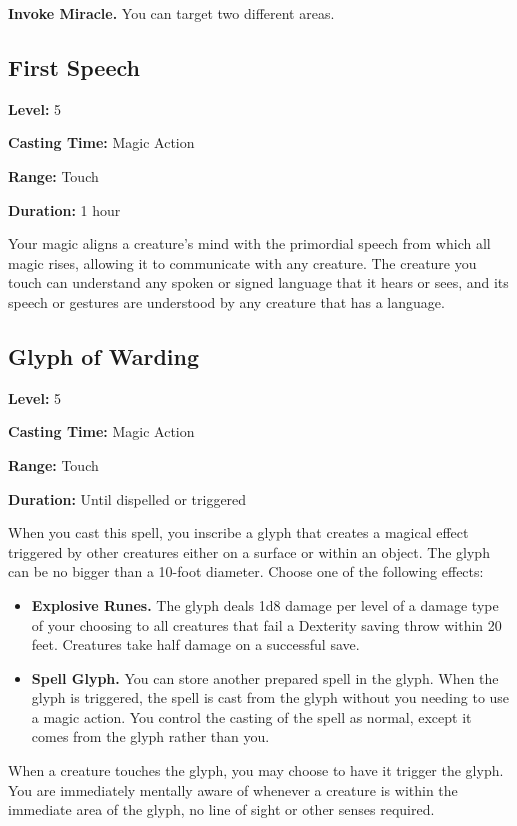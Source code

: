 \documentclass[12pt,letterpaper,twocolumn,openany,nodeprecatedcode,bg=none]{dndbook}
\providecommand{\tightlist}{%
  \setlength{\itemsep}{0pt}\setlength{\parskip}{0pt}}
\begin{document}
\textbf{Invoke Miracle.} You can target two different areas.

\subsection{First Speech}\label{first-speech}

\textbf{Level:} 5

\textbf{Casting Time:} Magic Action

\textbf{Range:} Touch

\textbf{Duration:} 1 hour

Your magic aligns a creature's mind with the primordial speech from
which all magic rises, allowing it to communicate with any creature. The
creature you touch can understand any spoken or signed language that it
hears or sees, and its speech or gestures are understood by any creature
that has a language.

\subsection{Glyph of Warding}\label{glyph-of-warding}

\textbf{Level:} 5

\textbf{Casting Time:} Magic Action

\textbf{Range:} Touch

\textbf{Duration:} Until dispelled or triggered

When you cast this spell, you inscribe a glyph that creates a magical
effect triggered by other creatures either on a surface or within an
object. The glyph can be no bigger than a 10-foot diameter. Choose one
of the following effects:

\begin{itemize}
\tightlist
\item
  \textbf{Explosive Runes.} The glyph deals 1d8 damage per level of a
  damage type of your choosing to all creatures that fail a Dexterity
  saving throw within 20 feet. Creatures take half damage on a
  successful save.
\item
  \textbf{Spell Glyph.} You can store another prepared spell in the
  glyph. When the glyph is triggered, the spell is cast from the glyph
  without you needing to use a magic action. You control the casting of
  the spell as normal, except it comes from the glyph rather than you.
\end{itemize}

When a creature touches the glyph, you may choose to have it trigger the
glyph. You are immediately mentally aware of whenever a creature is
within the immediate area of the glyph, no line of sight or other senses
required.
\end{document}
